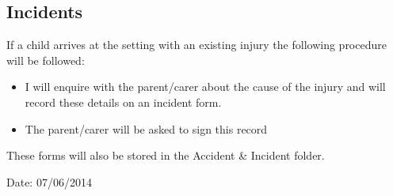 \documentclass[10pt]{article}
\begin{document}
\subsection{Incidents}

If a child arrives at the setting with an existing injury the following
procedure will be followed:

\begin{itemize}
\item
  I will enquire with the parent/carer about the cause of the injury
  and will record these details on an incident form.~
\item
  The parent/carer will be asked to sign this record~
\end{itemize}

These forms will also be stored in the Accident \& Incident folder.

Date: 07/06/2014

~
\end{document}
